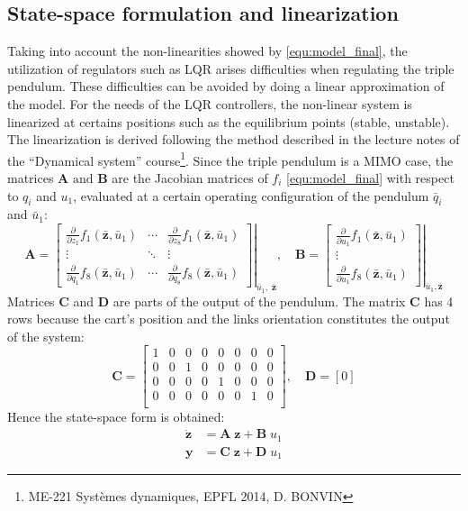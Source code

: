 \documentclass[a4paper,12pt]{article}
\begin{document}
\subsection{State-space formulation and linearization}
Taking into account the non-linearities showed by \eqref{equ:model_final}, the utilization of regulators such as LQR arises difficulties when regulating the triple pendulum. These difficulties can be avoided by doing a linear approximation of the model. For the needs of the LQR controllers, the non-linear system is linearized at certains positions such as the equilibrium points (stable, unstable). The linearization is derived following the method described in the lecture notes of the ``Dynamical system'' course\footnote{ME-221 Systèmes dynamiques, EPFL 2014, D. BONVIN}. Since the triple pendulum is a MIMO case, the matrices $\mathbf{A}\text{ and }\mathbf{B}$ are the Jacobian matrices of $f_i$ \eqref{equ:model_final} with respect to $q_i$ and $u_1$, evaluated at a certain operating configuration of the pendulum $\bar q_i$ and $\bar u_1$:
\[
\mathbf{A} = \left. {\left[
{\begin{array}{*{20}{c}}
\frac{\partial}{\partial {z_1}} f_1(\bar{\mathbf{z}},\bar u_1) & \cdots &\frac{\partial}{\partial {z_8}} f_1(\bar{\mathbf{z}},\bar u_1)\\
 \vdots & \ddots & \vdots \\
\frac{\partial}{\partial {q_1}}f_8(\bar{\mathbf{z}},\bar u_1) & \cdots &\frac{\partial}{\partial {q_8}}f_8(\bar{\mathbf{z}},\bar u_1)
\end{array}}\right]}
\right|_{\bar u_1,\;\bar{\mathbf{z}}},\quad
\mathbf{B} = \left. {\left[ {\begin{array}{*{20}{c}}
\frac{\partial}{\partial {u_1}}f_1(\bar{\mathbf{z}},\bar u_1)\\
 \vdots \\
\frac{\partial}{\partial {u_1}}f_8(\bar{\mathbf{z}},\bar u_1)
\end{array}} \right]} \right|_{\bar u_1, \bar{\mathbf{z}}}
\]
Matrices $\mathbf{C}$ and $\mathbf{D}$ are parts of the output of the pendulum. The matrix $\mathbf{C}$ has 4 rows because the cart's position and the links orientation constitutes the output of the system:
\[
\mathbf{C} =
\begin{bmatrix}
1 & 0 & 0 & 0 & 0 & 0 & 0 & 0 \\
0 & 0 & 1 & 0 & 0 & 0 & 0 & 0 \\
0 & 0 & 0 & 0 & 1 & 0 & 0 & 0 \\
0 & 0 & 0 & 0 & 0 & 0 & 1 & 0 \\
\end{bmatrix}, \quad
\mathbf{D} = [0]
\]
Hence the state-space form is obtained:
\begin{equation}
	\begin{split}
	\dot{\mathbf{z}} &= \mathbf{A}\; \mathbf{z} + \mathbf{B}\; u_1 \\
	\mathbf{y} &= \mathbf{C}\; \mathbf{z} + \mathbf{D}\; u_1
	\end{split}
\end{equation}
\end{document}
